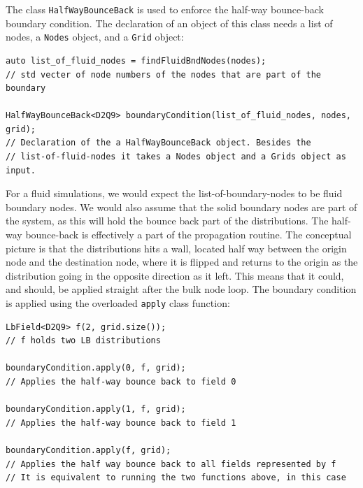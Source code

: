 \documentclass[11pt,a4paper]{report}
\begin{document}
The class \texttt{HalfWayBounceBack} is used to enforce the half-way bounce-back boundary condition.  The declaration of an object of this class needs a list of nodes, a \texttt{Nodes} object, and a \texttt{Grid} object:
\begin{verbatim}
auto list_of_fluid_nodes = findFluidBndNodes(nodes);
// std vecter of node numbers of the nodes that are part of the boundary

HalfWayBounceBack<D2Q9> boundaryCondition(list_of_fluid_nodes, nodes, grid);
// Declaration of the a HalfWayBounceBack object. Besides the 
// list-of-fluid-nodes it takes a Nodes object and a Grids object as input.
\end{verbatim}
For a fluid simulations, we would expect the list-of-boundary-nodes to be fluid boundary nodes. We would also assume that the solid boundary nodes are part of the system, as this will hold the bounce back part of the distributions. The half-way bounce-back is effectively a part of the propagation routine. The conceptual picture is that the distributions hits a wall, located half way between the origin node and the destination node, where it is flipped and returns to the origin as the distribution going in the opposite direction as it left. This means that it could, and should, be applied straight after the bulk node loop. The boundary condition is applied using the overloaded \texttt{apply} class function:
\begin{verbatim}
LbField<D2Q9> f(2, grid.size());
// f holds two LB distributions

boundaryCondition.apply(0, f, grid);
// Applies the half-way bounce back to field 0

boundaryCondition.apply(1, f, grid);
// Applies the half-way bounce back to field 1

boundaryCondition.apply(f, grid);
// Applies the half way bounce back to all fields represented by f
// It is equivalent to running the two functions above, in this case 
\end{verbatim}
\end{document}
